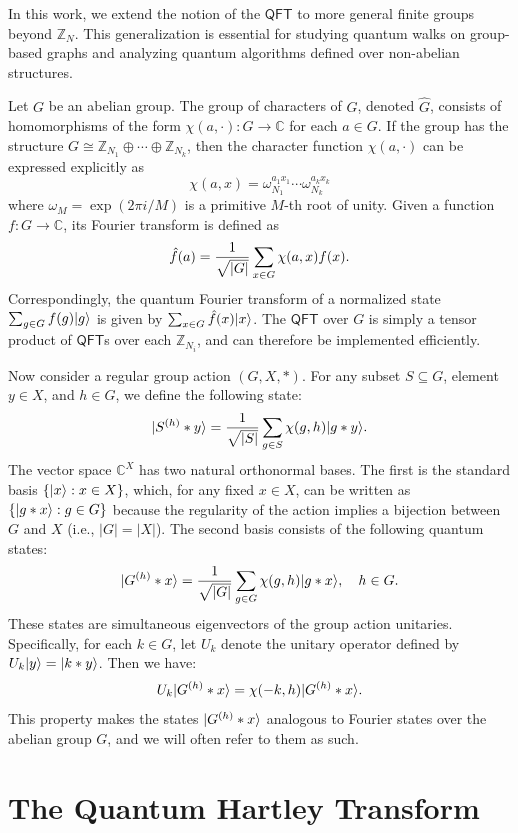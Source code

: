 \documentclass[12pt]{report}
\newcommand{\qft}{\mathsf{QFT}}
\begin{document}
In this work, we extend the notion of the $\qft$ to more general finite groups beyond \( \mathbb{Z}_N \). This generalization is essential for studying quantum walks on group-based graphs and analyzing quantum algorithms defined over non-abelian structures.


Let $G$ be an abelian group. The group of characters of $G$, denoted $\hat{G}$, consists of homomorphisms of the form $\chi(a, \cdot): G \to \mathbb{C}$ for each $a \in G$. If the group has the structure $G \cong \mathbb{Z}_{N_1} \oplus \cdots \oplus \mathbb{Z}_{N_k}$, then the character function $\chi(a, \cdot)$ can be expressed explicitly as
\[
\chi(a, x) = \omega_{N_1}^{a_1x_1} \cdots \omega_{N_k}^{a_kx_k}
\]
where $\omega_M = \exp(2\pi i / M)$ is a primitive $M$-th root of unity. Given a function $f: G \to \mathbb{C}$, its Fourier transform is defined as
\[
\hat{f}(a) = \frac{1}{\sqrt{\lvert G\rvert}} \sum_{x \in G} \chi(a, x) f(x).
\]
Correspondingly, the quantum Fourier transform of a normalized state $\sum_{g \in G} f(g) \lvert g\rangle$ is given by $\sum_{x \in G} \hat{f}(x) \lvert x\rangle$. The $\qft$ over \( G \) is simply a tensor product of $\qft$s over each \( \mathbb{Z}_{N_i} \), and can therefore be implemented efficiently.


Now consider a regular group action $(G, X, *)$. For any subset $S \subseteq G$, element $y \in X$, and $h \in G$, we define the following state:
\begin{equation}
    \label{eq:x-fourier-basis}
    \lvert S^{(h)} * y\rangle = \frac{1}{\sqrt{\lvert S\rvert}} \sum_{g \in S} \chi(g, h) \lvert g * y\rangle.
\end{equation}
The vector space $\mathbb{C}^X$ has two natural orthonormal bases. The first is the standard basis $\{\lvert x\rangle : x \in X\}$, which, for any fixed $x \in X$, can be written as $\{\lvert g * x\rangle : g \in G\}$ because the regularity of the action implies a bijection between $G$ and $X$ (i.e., $|G| = |X|$). The second basis consists of the following quantum states:
\[
\lvert G^{(h)} * x\rangle = \frac{1}{\sqrt{\lvert G\rvert}} \sum_{g \in G} \chi(g, h) \lvert g * x\rangle, \quad h \in G.
\]
These states are simultaneous eigenvectors of the group action unitaries. Specifically, for each $k \in G$, let $U_k$ denote the unitary operator defined by $U_k \lvert y\rangle = \lvert k * y\rangle$. Then we have:
\[
U_k \lvert G^{(h)} * x\rangle = \chi(-k, h) \lvert G^{(h)} * x\rangle.
\]
This property makes the states $\lvert G^{(h)} * x\rangle$ analogous to Fourier states over the abelian group $G$, and we will often refer to them as such.


\section{The Quantum Hartley Transform}
\end{document}
